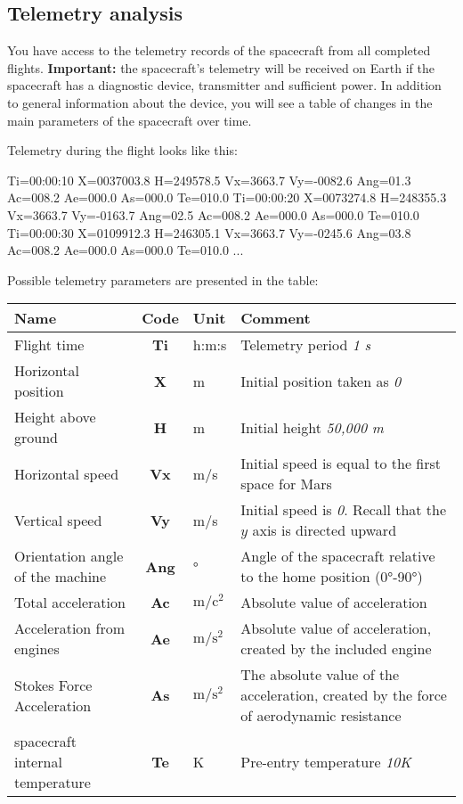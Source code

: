 \documentclass[12pt,a4paper]{article}
\begin{document}
\subsection{Telemetry analysis}

You have access to the telemetry records of the spacecraft from all completed flights. \textbf{Important:} the spacecraft's telemetry will be received on Earth if the spacecraft has a diagnostic device,
transmitter and sufficient power. In addition to general information about the device, you will see a table of changes in the main parameters of the spacecraft over time.

Telemetry during the flight looks like this:

\begin{verbatim*}
Ti=00:00:10 X=0037003.8 H=249578.5 Vx=3663.7 Vy=-0082.6 Ang=01.3
   Ac=008.2 Ae=000.0 As=000.0 Te=010.0
Ti=00:00:20 X=0073274.8 H=248355.3 Vx=3663.7 Vy=-0163.7 Ang=02.5
   Ac=008.2 Ae=000.0 As=000.0 Te=010.0
Ti=00:00:30 X=0109912.3 H=246305.1 Vx=3663.7 Vy=-0245.6 Ang=03.8
   Ac=008.2 Ae=000.0 As=000.0 Te=010.0
...
\end{verbatim*}

Possible telemetry parameters are presented in the table:

\begin{center}
\begin{tabular}{ |p{5cm}|c|p{2.5cm}|p{6cm}| }
   \hline
   \textbf{Name} & \textbf{Code} & \textbf{Unit} & \textbf{Comment} \\
   \hline
   Flight time & \textbf{Ti} & h:m:s & Telemetry period \emph{1 s}\\
   \hline
   Horizontal position & \textbf{X} & m & Initial position taken as \emph{0}\\
   \hline
   Height above ground & \textbf{H} & m & Initial height \emph{50,000 m}\\
   \hline
   Horizontal speed & \textbf{Vx} & m/s & Initial speed is equal to the first
   space for Mars\\
   \hline
   Vertical speed & \textbf{Vy} & m/s & Initial speed is
   \emph{0}. Recall that the $y$ axis is directed upward\\
   \hline
   Orientation angle of the machine & \textbf{Ang} & ° & Angle of the spacecraft relative to the home position (0°-90°)\\
   \hline
   Total acceleration & \textbf{Ac} & $\text{m}/\text{c}^{2}$ & Absolute value of acceleration\\
   \hline
   Acceleration from engines & \textbf{Ae} & $\text{m}/\text{s}^{2}$ & Absolute value of acceleration,
   created by the included engine\\
   \hline
   Stokes Force Acceleration & \textbf{As} & $\text{m}/\text{s}^{2}$ & The absolute value of the acceleration,
   created by the force of aerodynamic resistance\\
   \hline
   spacecraft internal temperature & \textbf{Te} & K & Pre-entry temperature \emph{10K}\\
   \hline
\end{tabular}
\end{center}
\end{document}
